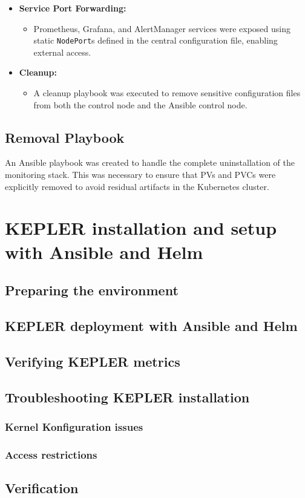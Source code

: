 \begin{itemize}
    \item \textbf{Service Port Forwarding:}
    \begin{itemize}
        \item Prometheus, Grafana, and AlertManager services were exposed using static \texttt{NodePort}s defined in the central configuration file, enabling external access.
    \end{itemize}

    \item \textbf{Cleanup:}
    \begin{itemize}
        \item A cleanup playbook was executed to remove sensitive configuration files from both the control node and the Ansible control node.
    \end{itemize}
\end{itemize}

\subsection{Removal Playbook}

An Ansible playbook was created to handle the complete uninstallation of the monitoring stack. This was necessary to ensure that PVs and PVCs were explicitly removed to avoid residual artifacts in the Kubernetes cluster.


\section{KEPLER installation and setup with Ansible and Helm}
\subsection{Preparing the environment}
\subsection{KEPLER deployment with Ansible and Helm}
\subsection{Verifying KEPLER metrics}
\subsection{Troubleshooting KEPLER installation}
\subsubsection{Kernel Konfiguration issues}
\subsubsection{Access restrictions}
\subsection{Verification}


